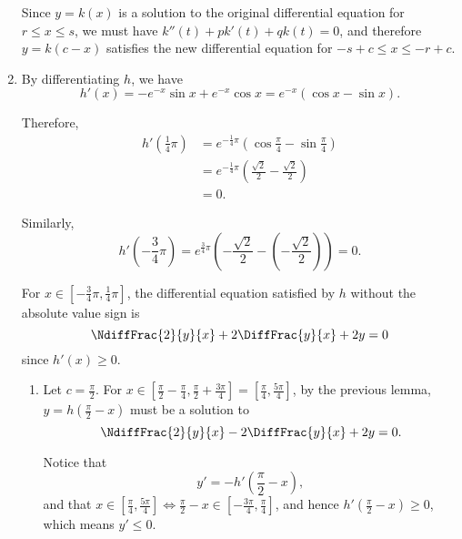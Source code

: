 \begin{enumerate}
          Since \(y = k(x)\) is a solution to the original differential equation for \(r \leq x \leq s\), we must have \(k''(t) + p k'(t) + q k(t) = 0\), and therefore \(y = k (c - x)\) satisfies the new differential equation for \(-s + c \leq x \leq -r + c\).

    \item By differentiating \(h\), we have
          \[
              h'(x) = - e^{-x} \sin x + e^{-x} \cos x = e^{-x} (\cos x - \sin x).
          \]

          Therefore,
          \begin{align*}
              h'\left(\frac{1}{4}\pi\right) & = e^{-\frac{1}{4}\pi} \left(\cos \frac{\pi}{4} - \sin \frac{\pi}{4}\right)  \\
                                            & = e^{-\frac{1}{4} \pi} \left(\frac{\sqrt{2}}{2} - \frac{\sqrt{2}}{2}\right) \\
                                            & = 0.
          \end{align*}

          Similarly,
          \[
              h'\left(-\frac{3}{4}\pi\right) = e^{\frac{3}{4}\pi} \left(-\frac{\sqrt{2}}{2} - \left(-\frac{\sqrt{2}}{2}\right)\right) = 0.
          \]

          For \(x \in \left[- \frac{3}{4}\pi, \frac{1}{4}\pi\right]\), the differential equation satisfied by \(h\) without the absolute value sign is
          \[
              \NdiffFrac{2}{y}{x} + 2 \DiffFrac{y}{x} + 2y = 0
          \]
          since \(h'(x) \geq 0\).

          \begin{enumerate}
              \item Let \(c = \frac{\pi}{2}\). For \(x \in \left[\frac{\pi}{2} - \frac{\pi}{4}, \frac{\pi}{2} + \frac{3\pi}{4}\right] = \left[\frac{\pi}{4}, \frac{5\pi}{4}\right]\), by the previous lemma, \(y = h\left(\frac{\pi}{2} - x\right)\) must be a solution to
                    \[
                        \NdiffFrac{2}{y}{x} - 2 \DiffFrac{y}{x} + 2y = 0.
                    \]

                    Notice that
                    \[
                        y' = -h' \left(\frac{\pi}{2} - x\right),
                    \]
                    and that \(x \in \left[\frac{\pi}{4}, \frac{5\pi}{4}\right] \iff \frac{\pi}{2} - x \in \left[-\frac{3\pi}{4}, \frac{\pi}{4}\right]\), and hence \(h'\left(\frac{\pi}{2} - x\right) \geq 0\), which means \(y' \leq 0\).


\end{enumerate}
\end{enumerate}
